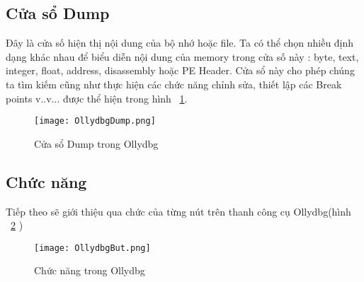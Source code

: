 	\newpage	
	\subsection*{Cửa sổ Dump}
	Đây là cửa số hiện thị nội dung của bộ nhớ hoặc file. Ta có thể chọn nhiều định dạng khác nhau để biểu diễn nội dung của memory trong cửa số này : byte, text, integer, float, address, disassembly hoặc PE Header. Cửa sổ này cho phép chúng ta tìm kiếm cũng như  thực hiện các chức năng chỉnh sửa, thiết lập các Break points v..v... được thể hiện trong hình ~\ref{fig:OllydbgDump}.
	\begin{center}
			\begin{figure}[htp]
				\begin{center}
					\texttt{[image: OllydbgDump.png]}
				\end{center}
				\caption{Cửa sổ Dump trong Ollydbg}	
					\label{fig:OllydbgDump}		
			\end{figure}
		\end{center}		
		
	\subsection*{Chức năng}
	Tiếp theo sẽ giới thiệu qua chức của từng nút trên thanh công cụ Ollydbg(hình ~\ref{fig:OllydbgBut} )
		\begin{center}
			\begin{figure}[htp]
				\begin{center}
					\texttt{[image: OllydbgBut.png]}
				\end{center}
				\caption{Chức năng trong Ollydbg}	
					\label{fig:OllydbgBut}		
			\end{figure}
		\end{center}		
		
